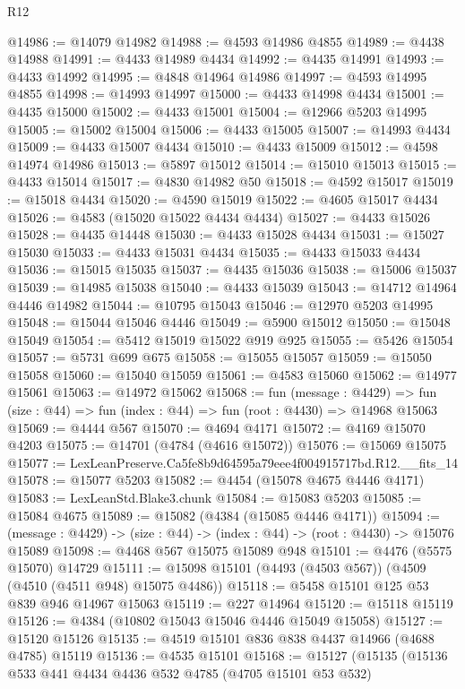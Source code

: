 \begin{lexlean}{R12}
\begin{coremodule}
@14986 := @14079 @14982
@14988 := @4593 @14986 @4855
@14989 := @4438 @14988
@14991 := @4433 @14989 @4434
@14992 := @4435 @14991
@14993 := @4433 @14992
@14995 := @4848 @14964 @14986
@14997 := @4593 @14995 @4855
@14998 := @14993 @14997
@15000 := @4433 @14998 @4434
@15001 := @4435 @15000
@15002 := @4433 @15001
@15004 := @12966 @5203 @14995
@15005 := @15002 @15004
@15006 := @4433 @15005
@15007 := @14993 @4434
@15009 := @4433 @15007 @4434
@15010 := @4433 @15009
@15012 := @4598 @14974 @14986
@15013 := @5897 @15012
@15014 := @15010 @15013
@15015 := @4433 @15014
@15017 := @4830 @14982 @50
@15018 := @4592 @15017
@15019 := @15018 @4434
@15020 := @4590 @15019
@15022 := @4605 @15017 @4434
@15026 := @4583 (@15020 @15022 @4434 @4434)
@15027 := @4433 @15026
@15028 := @4435 @14448
@15030 := @4433 @15028 @4434
@15031 := @15027 @15030
@15033 := @4433 @15031 @4434
@15035 := @4433 @15033 @4434
@15036 := @15015 @15035
@15037 := @4435 @15036
@15038 := @15006 @15037
@15039 := @14985 @15038
@15040 := @4433 @15039
@15043 := @14712 @14964 @4446 @14982
@15044 := @10795 @15043
@15046 := @12970 @5203 @14995
@15048 := @15044 @15046 @4446
@15049 := @5900 @15012
@15050 := @15048 @15049
@15054 := @5412 @15019 @15022 @919 @925
@15055 := @5426 @15054
@15057 := @5731 @699 @675
@15058 := @15055 @15057
@15059 := @15050 @15058
@15060 := @15040 @15059
@15061 := @4583 @15060
@15062 := @14977 @15061
@15063 := @14972 @15062
@15068 := fun (message : @4429) =>
  fun (size : @44) => fun (index : @44) => fun (root : @4430) => @14968 @15063
@15069 := @4444 @567
@15070 := @4694 @4171
@15072 := @4169 @15070 @4203
@15075 := @14701 (@4784 (@4616 @15072))
@15076 := @15069 @15075
@15077 := LexLeanPreserve.Ca5fe8b9d64595a79eee4f004915717bd.R12.__fits_14
@15078 := @15077 @5203
@15082 := @4454 (@15078 @4675 @4446 @4171)
@15083 := LexLeanStd.Blake3.chunk
@15084 := @15083 @5203
@15085 := @15084 @4675
@15089 := @15082 (@4384 (@15085 @4446 @4171))
@15094 := (message : @4429) -> (size : @44) -> (index : @44) -> (root : @4430) -> @15076 @15089
@15098 := @4468 @567 @15075 @15089 @948
@15101 := @4476 (@5575 @15070) @14729
@15111 := @15098 @15101 (@4493 (@4503 @567)) (@4509 (@4510 (@4511 @948) @15075 @4486))
@15118 := @5458 @15101 @125 @53 @839 @946 @14967 @15063
@15119 := @227 @14964
@15120 := @15118 @15119
@15126 := @4384 (@10802 @15043 @15046 @4446 @15049 @15058)
@15127 := @15120 @15126
@15135 := @4519 @15101 @836 @838 @4437 @14966 (@4688 @4785) @15119
@15136 := @4535 @15101
@15168 := @15127
    (@15135
      (@15136
        @533
        @441
        @4434
        @4436
        @532
        @4785
        (@4705 @15101 @53 @532)

\end{coremodule}
\end{lexlean}
